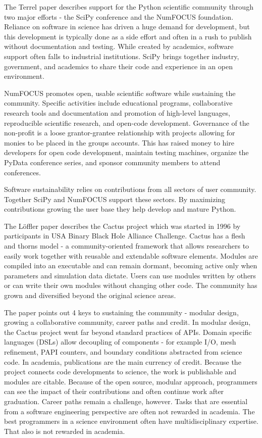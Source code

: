\documentclass[11pt, oneside]{amsart}
\begin{document}
The Terrel paper describes support for the Python scientific community through two major efforts - the SciPy conference and the
NumFOCUS foundation. Reliance on software in science has driven a huge demand for development, but this development is typically done as a side effort
and often in a rush to publish without documentation and testing.
While created by academics, software support often falls to industrial institutions. SciPy brings together industry, government, 
and academics to share their code and experience in an open environment. 

NumFOCUS promotes open, usable scientific software while sustaining the community. Specific activities include educational programs, 
collaborative research tools and documentation and 
promotion of high-level languages, reproducible scientific research, and open-code development.
Governance of the non-profit is a loose grantor-grantee relationship with projects allowing for monies to be placed in the groups accounts.
This has raised money to hire developers for open code development, maintain testing machines, organize the PyData conference series, and sponsor community members to attend conferences.

Software sustainability relies on contributions from all sectors of user community. Together SciPy and NumFOCUS support these sectors. By maximizing contributions growing the user base they help develop and mature Python.

The L\"{o}ffler paper describes the Cactus project which was started in 1996 by participants in USA Binary Black Hole Alliance 
Challenge. Cactus has a flesh and thorns model - a community-oriented framework that allows researchers to easily work 
together with reusable and extendable software elements. Modules are compiled into an executable and can remain dormant, becoming
active only when parameters and simulation data dictate. Users can  use modules written by others or can write their own 
modules without changing other code. The community has grown and diversified beyond the original science areas.

The paper points out 4 keys to sustaining the community - modular design, growing a collaborative community, career paths and credit.
In modular design, the Cactus project went far beyond standard practices of APIs. 
Domain specific languages (DSLs) allow decoupling of components - for example I/O, mesh refinement, PAPI counters, and
boundary conditions abstracted from science code. In academia, publications are the main currency of credit. Because the 
project connects code developments to science, the work is 
publishable and modules are citable. Because of the open source, modular approach, programmers can see the impact of their contributions and often continue
work after graduation. Career paths remain a challenge, however. Tasks that are essential from a software engineering perspective
are often not rewarded in academia. The best programmers in a science environment often have multidisciplinary expertise.
That also is not rewarded in academia.
\end{document}
